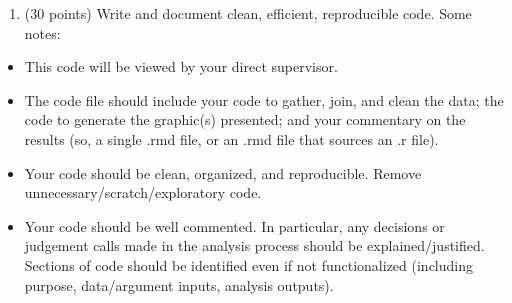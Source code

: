 \documentclass[
]{article}
\providecommand{\tightlist}{%
  \setlength{\itemsep}{0pt}\setlength{\parskip}{0pt}}
\begin{document}
\begin{enumerate}
\def\labelenumi{\arabic{enumi}.}
\setcounter{enumi}{2}
\tightlist
\item
  (30 points) Write and document clean, efficient, reproducible code.
  Some notes:
\end{enumerate}

\begin{itemize}
\item
  This code will be viewed by your direct supervisor.
\item
  The code file should include your code to gather, join, and clean the
  data; the code to generate the graphic(s) presented; and your
  commentary on the results (so, a single .rmd file, or an .rmd file
  that sources an .r file).
\item
  Your code should be clean, organized, and reproducible. Remove
  unnecessary/scratch/exploratory code.
\item
  Your code should be well commented. In particular, any decisions or
  judgement calls made in the analysis process should be
  explained/justified. Sections of code should be identified even if not
  functionalized (including purpose, data/argument inputs, analysis
  outputs).
\end{itemize}
\end{document}
